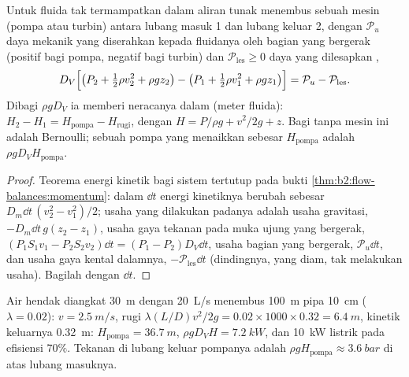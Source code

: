 \begin{theorem}\label{thm:b2:flow-balances:energy}
Untuk fluida tak termampatkan dalam aliran tunak menembus sebuah mesin (pompa atau
turbin) antara lubang masuk 1 dan lubang keluar 2, dengan $\mathcal P_u$
daya mekanik yang diserahkan kepada fluidanya oleh bagian yang bergerak (positif bagi
pompa, negatif bagi turbin) dan $\mathcal P_{\text{les}} \ge 0$ daya
yang dilesapkan ,
\[
D_V\Bigl[\bigl(P_2 + \tfrac12\rho v_2^2 + \rho gz_2\bigr) - \bigl(P_1 + \tfrac12\rho v_1^2
+ \rho gz_1\bigr)\Bigr] = \mathcal P_u - \mathcal P_{\text{les}} .
\]
Dibagi $\rho gD_V$ ia memberi neracanya dalam \emph{} (meter
fluida): $H_2 - H_1 = H_{\text{pompa}} - H_{\text{rugi}}$, dengan $H = P/\rho g +
v^2/2g + z$. Bagi  tanpa mesin ini adalah Bernoulli;
\emph{} sebuah pompa yang menaikkan  sebesar $H_{\text{pompa}}$ adalah
$\rho gD_VH_{\text{pompa}}$.
\end{theorem}

\begin{proof}
Teorema energi kinetik bagi sistem tertutup pada bukti
\cref{thm:b2:flow-balances:momentum}: dalam $\dd t$ energi kinetiknya
berubah sebesar $D_m\dd t\,(v_2^2 - v_1^2)/2$; usaha yang dilakukan padanya adalah usaha
gravitasi, $-D_m\dd t\,g(z_2 - z_1)$, usaha gaya tekanan pada muka ujung
yang bergerak, $(P_1S_1v_1 - P_2S_2v_2)\dd t = (P_1 - P_2)D_V\dd t$, usaha
bagian yang bergerak, $\mathcal P_u\dd t$, dan usaha gaya kental dalamnya,
$-\mathcal P_{\text{les}}\dd t$ (dindingnya, yang diam, tak melakukan usaha). Bagilah dengan
$\dd t$.
\end{proof}

\begin{example}\label{ex:b2:flow-balances:pump}
Air hendak diangkat \qty{30}{m} dengan \qty{20}{L/s} menembus \qty{100}{m}
pipa \qty{10}{cm} ($\lambda = 0.02$): $v = \qty{2.5}{m/s}$, rugi  $\lambda(L/D)
v^2/2g = 0.02 \times 1000 \times 0.32 = \qty{6.4}{m}$,  kinetik keluarnya
\qty{0.32}{m}: $H_{\text{pompa}} = \qty{36.7}{m}$,  $\rho gD_VH =
\qty{7.2}{kW}$, dan \qty{10}{kW} listrik pada efisiensi $70\%$.
Tekanan di lubang keluar pompanya adalah $\rho gH_{\text{pompa}} \approx \qty{3.6}{bar}$ di atas
lubang masuknya.
\end{example}

